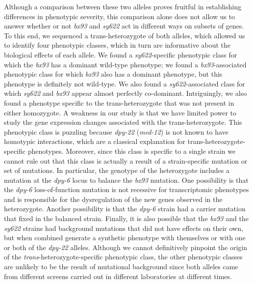 \documentclass[10pt, onecolumn]{article}
\newcommand{\gene}[1]{\mbox{\emph{#1}}}
\newcommand{\dpy}{\gene{dpy-22} (\emph{med-12})}
\begin{document}
Although a comparison between these two alleles proves fruitful in establishing
differences in phenotypic severity, this comparison alone does not allow us to
answer whether or not \emph{bx93} and \emph{sy622} act in different ways on
subsets of genes. To this end, we sequenced a trans-heterozygote of both
alleles, which allowed us to identify four phenotypic classes, which in turn are
informative about the biological effects of each allele. We found a
\emph{sy622}-specific phenotypic class for which the \emph{bx93} has a dominant
wild-type phenotype; we found a \emph{bx93}-associated phenotypic class for
which \emph{bx93} also has a dominant phenotype, but this phenotype is
definitely not wild-type. We also found a \emph{sy622}-associated class for
which \emph{sy622} and \emph{bx93} appear almost perfectly co-dominant.
Intriguingly, we also found a phenotype specific to the trans-heterozygote that
was not present in either homozygote. A weakness in our study is that we have
limited power to study the gene expression changes associated with the
trans-heterozygote. This phenotypic class is puzzling because \dpy{} is not
known to have homotypic interactions, which are a classical explanation for
trans-heterozygote-specific phenotypes. Moreover, since this class is specific
to a single strain we cannot rule out that this class is actually a result of a
strain-specific mutation or set of mutations. In particular, the genotype of the
heterozygote includes a mutation at the \gene{dpy-6} locus to balance the
\emph{bx93} mutation. One possibility is that the \emph{dpy-6} loss-of-function
mutation is not recessive for transcriptomic phenotypes and is responsible for
the dysregulation of the new genes observed in the heterozygote. Another
possibility is that the \emph{dpy-6} strain had a carrier mutation that fixed in
the balanced strain. Finally, it is also possible that the \emph{bx93} and the
\emph{sy622} strains had background mutations that did not have effects on their
own, but when combined generate a synthetic phenotype with themselves or with
one or both of the \gene{dpy-22} alleles. Although we cannot definitively
pinpoint the origin of the \emph{trans}-heterozygote-specific phenotypic class,
the other phenotypic classes are unlikely to be the result of mutational
background since both alleles came from different screens carried out in different
laboratories at different times.
\end{document}
